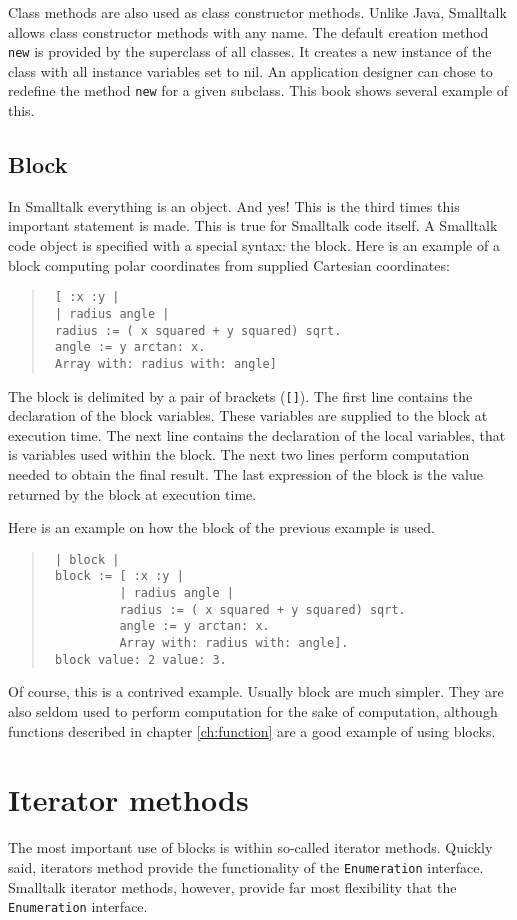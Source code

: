 \documentclass[twoside]{book}
\begin{document}
Class methods are also used as class constructor methods. Unlike
Java, Smalltalk allows class constructor methods with any name.
The default creation method {\tt new} is provided by the
superclass of all classes. It creates a new instance of the class
with all instance variables set to nil. An application designer
can chose to redefine the method {\tt new} for a given subclass.
This book shows several example of this.

\subsection{Block}
In Smalltalk everything is an object. And yes! This is the third
times this important statement is made. This is true for Smalltalk
code itself. A Smalltalk code object is specified with a special
syntax: the block. Here is an example of a block 
computing polar coordinates from supplied Cartesian coordinates:
\begin{quote}
\begin{verbatim}
 [ :x :y |
 | radius angle |
 radius := ( x squared + y squared) sqrt.
 angle := y arctan: x.
 Array with: radius with: angle]
\end{verbatim}
\end{quote}
The block  is delimited by a pair of brackets ({\tt []}).
The first line contains the declaration of the block variables.
These variables are supplied to the block  at execution
time. The next line contains the declaration of the local
variables, that is variables used within the block. The next two
lines perform computation needed to obtain the final result. The
last expression of the block  is the value returned by the
block  at execution time.

Here is an example on how the block of the previous example is
used.
\begin{quote}
\begin{verbatim}
 | block |
 block := [ :x :y |
          | radius angle |
          radius := ( x squared + y squared) sqrt.
          angle := y arctan: x.
          Array with: radius with: angle].
 block value: 2 value: 3.
\end{verbatim}
\end{quote}
Of course, this is a contrived example. Usually block  are
much simpler. They are also seldom used to perform computation for
the sake of computation, although functions described in chapter
\ref{ch:function} are a good example of using blocks.

\section{Iterator methods}
\label{sec:iterator} The most important use of blocks is
within so-called iterator methods. Quickly said, iterators method
provide the functionality of the {\tt Enumeration} interface.
Smalltalk iterator methods, however, provide far most flexibility
that the {\tt Enumeration} interface.
\end{document}
